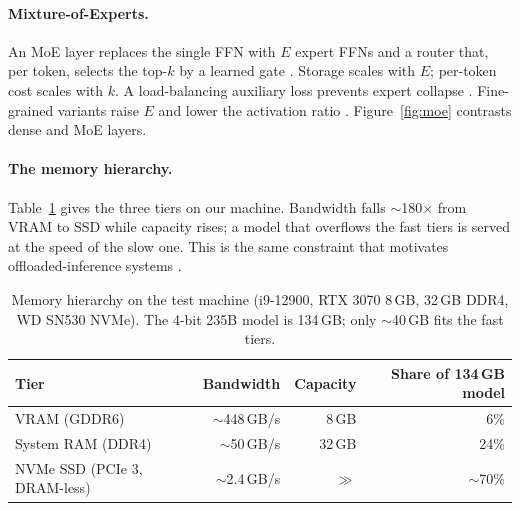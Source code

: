\documentclass[11pt]{article}
\begin{document}
\paragraph{Mixture-of-Experts.}
An MoE layer replaces the single FFN with $E$ expert FFNs and a router that,
per token, selects the top-$k$ by a learned gate
\citep{shazeer2017moe,fedus2022switch,lepikhin2021gshard}. Storage scales with
$E$; per-token cost scales with $k$. A load-balancing auxiliary loss prevents
expert collapse \citep{fedus2022switch}. Fine-grained variants raise $E$ and
lower the activation ratio \citep{dai2024deepseekmoe}. Figure~\ref{fig:moe} contrasts
dense and MoE layers.

\paragraph{The memory hierarchy.}
Table~\ref{tab:hier} gives the three tiers on our machine. Bandwidth falls
$\sim$180$\times$ from VRAM to SSD while capacity rises; a model that overflows
the fast tiers is served at the speed of the slow one. This is the same
constraint that motivates offloaded-inference systems
\citep{sheng2023flexgen,xue2024powerinfer2,xue2024moeinfinity}.

\begin{table}[t]\centering
\caption{Memory hierarchy on the test machine (i9-12900, RTX 3070 8\,GB, 32\,GB
DDR4, WD SN530 NVMe). The 4-bit 235B model is 134\,GB; only $\sim$40\,GB fits
the fast tiers.}
\label{tab:hier}
\small
\begin{tabular}{lrrr}
\toprule
Tier & Bandwidth & Capacity & Share of 134\,GB model \\
\midrule
VRAM (GDDR6) & $\sim$448\,GB/s & 8\,GB & 6\% \\
System RAM (DDR4) & $\sim$50\,GB/s & 32\,GB & 24\% \\
NVMe SSD (PCIe 3, DRAM-less) & $\sim$2.4\,GB/s & $\gg$ & $\sim$70\% \\
\bottomrule
\end{tabular}
\end{table}
\end{document}

